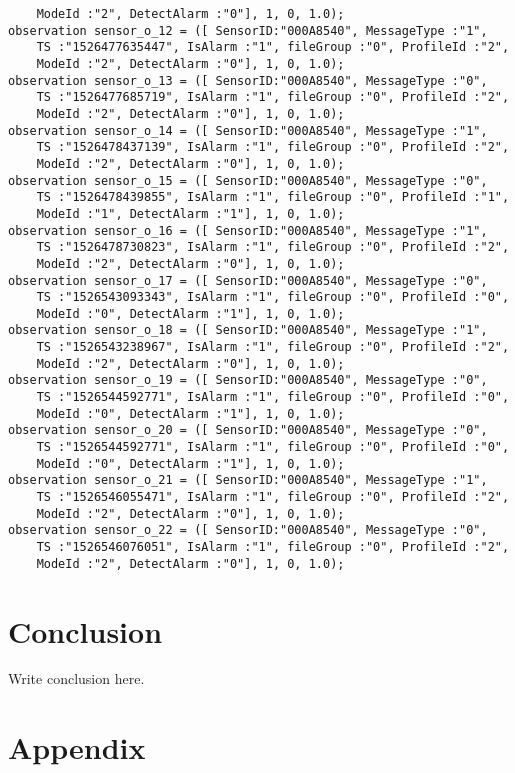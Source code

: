 \documentclass{easychair}
\begin{document}
\begin{lstlisting}
	ModeId :"2", DetectAlarm :"0"], 1, 0, 1.0);
observation sensor_o_12 = ([ SensorID:"000A8540", MessageType :"1",
	TS :"1526477635447", IsAlarm :"1", fileGroup :"0", ProfileId :"2",
	ModeId :"2", DetectAlarm :"0"], 1, 0, 1.0);
observation sensor_o_13 = ([ SensorID:"000A8540", MessageType :"0",
	TS :"1526477685719", IsAlarm :"1", fileGroup :"0", ProfileId :"2",
	ModeId :"2", DetectAlarm :"0"], 1, 0, 1.0);
observation sensor_o_14 = ([ SensorID:"000A8540", MessageType :"1",
	TS :"1526478437139", IsAlarm :"1", fileGroup :"0", ProfileId :"2",
	ModeId :"2", DetectAlarm :"0"], 1, 0, 1.0);
observation sensor_o_15 = ([ SensorID:"000A8540", MessageType :"0",
	TS :"1526478439855", IsAlarm :"1", fileGroup :"0", ProfileId :"1",
	ModeId :"1", DetectAlarm :"1"], 1, 0, 1.0);
observation sensor_o_16 = ([ SensorID:"000A8540", MessageType :"1",
	TS :"1526478730823", IsAlarm :"1", fileGroup :"0", ProfileId :"2",
	ModeId :"2", DetectAlarm :"0"], 1, 0, 1.0);
observation sensor_o_17 = ([ SensorID:"000A8540", MessageType :"0",
	TS :"1526543093343", IsAlarm :"1", fileGroup :"0", ProfileId :"0",
	ModeId :"0", DetectAlarm :"1"], 1, 0, 1.0);
observation sensor_o_18 = ([ SensorID:"000A8540", MessageType :"1",
	TS :"1526543238967", IsAlarm :"1", fileGroup :"0", ProfileId :"2",
	ModeId :"2", DetectAlarm :"0"], 1, 0, 1.0);
observation sensor_o_19 = ([ SensorID:"000A8540", MessageType :"0",
	TS :"1526544592771", IsAlarm :"1", fileGroup :"0", ProfileId :"0",
	ModeId :"0", DetectAlarm :"1"], 1, 0, 1.0);
observation sensor_o_20 = ([ SensorID:"000A8540", MessageType :"0",
	TS :"1526544592771", IsAlarm :"1", fileGroup :"0", ProfileId :"0",
	ModeId :"0", DetectAlarm :"1"], 1, 0, 1.0);
observation sensor_o_21 = ([ SensorID:"000A8540", MessageType :"1",
	TS :"1526546055471", IsAlarm :"1", fileGroup :"0", ProfileId :"2",
	ModeId :"2", DetectAlarm :"0"], 1, 0, 1.0);
observation sensor_o_22 = ([ SensorID:"000A8540", MessageType :"0",
	TS :"1526546076051", IsAlarm :"1", fileGroup :"0", ProfileId :"2",
	ModeId :"2", DetectAlarm :"0"], 1, 0, 1.0);

\end{lstlisting}

\section{Conclusion}
\label{sect:conclusion} Write conclusion here.


\newpage
\section{Appendix}
\end{document}
